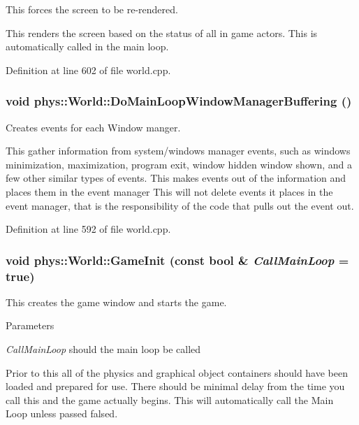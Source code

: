 This forces the screen to be re-\/rendered. 

This renders the screen based on the status of all in game actors. This is automatically called in the main loop. 

Definition at line 602 of file world.cpp.

\hypertarget{classphys_1_1World_af7bc68e5a19fd4c9c8cc2437485096e1}{
\subsubsection[{DoMainLoopWindowManagerBuffering}]{\setlength{\rightskip}{0pt plus 5cm}void phys::World::DoMainLoopWindowManagerBuffering ()}}
\label{da/ddf/classphys_1_1World_af7bc68e5a19fd4c9c8cc2437485096e1}


Creates events for each Window manger. 

This gather information from system/windows manager events, such as windows minimization, maximization, program exit, window hidden window shown, and a few other similar types of events. This makes events out of the information and places them in the event manager This will not delete events it places in the event manager, that is the responsibility of the code that pulls out the event out. 

Definition at line 592 of file world.cpp.

\hypertarget{classphys_1_1World_a21cc36be08a61f40619584d4c438936b}{
\subsubsection[{GameInit}]{\setlength{\rightskip}{0pt plus 5cm}void phys::World::GameInit (const bool \& {\em CallMainLoop} = {\ttfamily true})}}
\label{da/ddf/classphys_1_1World_a21cc36be08a61f40619584d4c438936b}


This creates the game window and starts the game. 


\begin{DoxyParams}{Parameters}
\item[{\em CallMainLoop}]should the main loop be called\end{DoxyParams}
Prior to this all of the physics and graphical object containers should have been loaded and prepared for use. There should be minimal delay from the time you call this and the game actually begins. This will automatically call the Main Loop unless passed falsed. 

